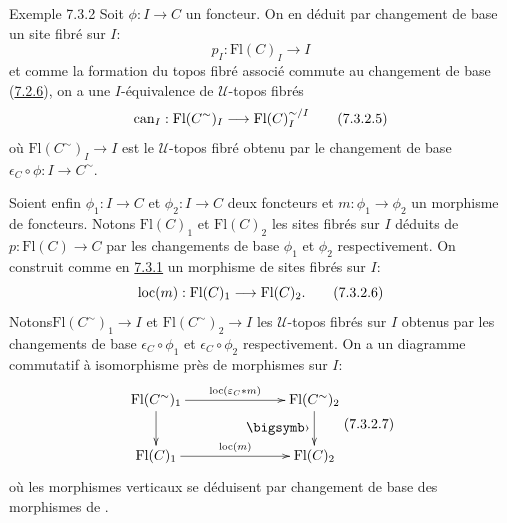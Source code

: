 \documentclass[10pt]{../fichiers-configuration-latex/smfart}
\begin{document}
\begin{enonce*}[remark]{Exemple 7.3.2}
Soit $\phi : I \to C$ un foncteur. On en déduit par changement de base
un site fibré sur $I$:
\begin{equation*}
p_I : \text{Fl} (C)_I \to I\tag{7.3.2.4}
\end{equation*}
et comme la formation du topos fibré associé commute au changement de
base (\hyperref[VI.subsubsec7.2.6]{7.2.6}), on a une $I$-équivalence de $𝒰$-topos fibrés
\begin{equation*}
\can_I : \text{Fl} (C^{\sim})_{I} \to \text{Fl}(C)^{\sim/I}_{I}\tag{7.3.2.5}
\end{equation*}
où $\text{Fl}(C^{\sim})_{I} \to I$ est le $𝒰$-topos fibré obtenu par le
changement de base $\epsilon_C \circ \phi : I \to C^{\sim}$.

Soient enfin $\phi_1 : I \to C$ et $\phi_2 : I \to C$ deux foncteurs
et $m : \phi_1 \to \phi_2$ un morphisme de foncteurs. Notons $\text{Fl}(C)_1$
et $\text{Fl}(C)_2$ les sites fibrés sur $I$ déduits de $p :
\text{Fl}(C) \to C$ par les changements de base $\phi_1$ et $\phi_2$
respectivement. On
construit comme en \hyperref[VI.exem7.3.1]{7.3.1} un morphisme de sites fibrés sur $I$:
\begin{equation*}
\loc(m) : \text{Fl} (C)_1 \to \text{Fl}(C)_2{\quoi}.\tag{7.3.2.6}
\end{equation*}
Notons\pageoriginale $\text{Fl}(C^{\sim})_1 \to I$ et
$\text{Fl}(C^{\sim})_2 \to I$ les $𝒰$-topos fibrés sur $I$
obtenus par les changements de base $\epsilon_C \circ \phi_1$ et
$\epsilon_C \circ \phi_2$ respectivement. On a un diagramme
commutatif à isomorphisme près de morphismes sur $I$:
\[\vcenter{
\xymatrix@C=2.5cm{
\text{Fl}(C^{\sim})_1 \ar[d]\ar[r]^{\loc(\varepsilon_C\ast m)}&
\text{Fl}(C^{\sim})_2 \ar[d]_{\bigdot}\\
\text{Fl}(C)_1       \ar[r]^{\loc(m)} & \text{Fl}(C)_2
}}\leqno{(7.3.2.7)}
\]
où les morphismes verticaux se déduisent par changement de base des
morphismes de .
\end{enonce*}
\end{document}
